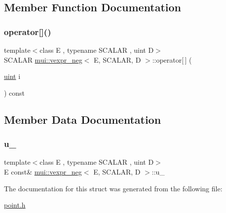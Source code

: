 \subsection{Member Function Documentation}
\mbox{\label{structmui_1_1vexpr__neg_a2845aee72ef9e362e8e64a7a734ba868}} 
\subsubsection{\texorpdfstring{operator[]()}{operator[]()}}
{\footnotesize\ttfamily template$<$class E , typename S\+C\+A\+L\+AR , uint D$>$ \\
S\+C\+A\+L\+AR \hyperlink{structmui_1_1vexpr__neg}{mui\+::vexpr\+\_\+neg}$<$ E, S\+C\+A\+L\+AR, D $>$\+::operator\mbox{[}$\,$\mbox{]} (\begin{DoxyParamCaption}\item[{\hyperlink{namespacemui_af15a3e7188a2117fb9965277bb0cacd2}{uint}}]{i }\end{DoxyParamCaption}) const\hspace{0.3cm}{\ttfamily [inline]}}



\subsection{Member Data Documentation}
\mbox{\label{structmui_1_1vexpr__neg_a0e9d4ff090af9d4fd420fae6e8f6c614}} 
\subsubsection{\texorpdfstring{u\+\_\+}{u\_}}
{\footnotesize\ttfamily template$<$class E , typename S\+C\+A\+L\+AR , uint D$>$ \\
E const\& \hyperlink{structmui_1_1vexpr__neg}{mui\+::vexpr\+\_\+neg}$<$ E, S\+C\+A\+L\+AR, D $>$\+::u\+\_\+\hspace{0.3cm}{\ttfamily [protected]}}



The documentation for this struct was generated from the following file\+:\begin{DoxyCompactItemize}
\item 
\hyperlink{point_8h}{point.\+h}\end{DoxyCompactItemize}
